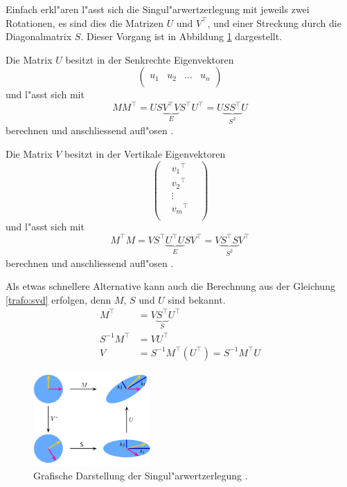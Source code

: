 \begin{refsection}
Einfach erkl"aren l"asst sich die Singul"arwertzerlegung mit jeweils zwei Rotationen, es sind dies die Matrizen $U$ und $V^\top$, und einer Streckung durch die Diagonalmatrix $S$. Dieser Vorgang ist in Abbildung \ref{trafo:SVDFig} dargestellt. 

Die Matrix $U$ besitzt in der Senkrechte Eigenvektoren
\begin{equation*}
	\left( 
		\begin{array}{cccc}
		& & & \\
		u_1 & u_2 & \dots & u_n  \\
		& & & 			
		\end{array}
	\right) 
\end{equation*}
und l"asst sich mit 
\begin{equation*}
	M M^\top = U S \underbrace{V^\top V}_{E} S^\top U^\top = U \underbrace{S S^\top}_{S^2} U
\end{equation*}
berechnen und anschliessend aufl"osen \cite{tafo:Watkins}.

Die Matrix $V$ besitzt in der Vertikale Eigenvektoren
\begin{equation*}
	\left( 
		\begin{array}{ccc}
		& {v_1}^{\top} & \\
		& {v_2}^{\top} & \\
		& \vdots & \\
		&  {v_m}^{\top} & \\			
		\end{array}
	\right) 
\end{equation*}
und l"asst sich mit 
\begin{equation*}
	M^\top M = V S^\top \underbrace{U^\top U}_{E} S V^\top = V \underbrace{S^\top S}_{S^2} V^\top 
\end{equation*}
berechnen und anschliessend aufl"osen \cite{trafo:Watkins}.

Als etwas schnellere Alternative kann auch die Berechnung aus der Gleichung \ref{trafo:svd} erfolgen, denn $M$, $S$ und $U$ sind bekannt. 
\begin{align*}
	M^\top &= V \underbrace{S^\top}_{S} U^\top\\
	S^{-1} M^\top &= V U^\top\\
	V &= S^{-1} M^\top \left(U^\top\right) = S^{-1} M^\top U
\end{align*}

\begin{figure}
	\centering
	\includegraphics[width=0.4\textwidth]{./trafo/images/svd.png}
	\caption{Grafische Darstellung der Singul"arwertzerlegung \cite{trafo:SVDWiki}.}
	\label{trafo:SVDFig}
\end{figure}


\end{refsection}
